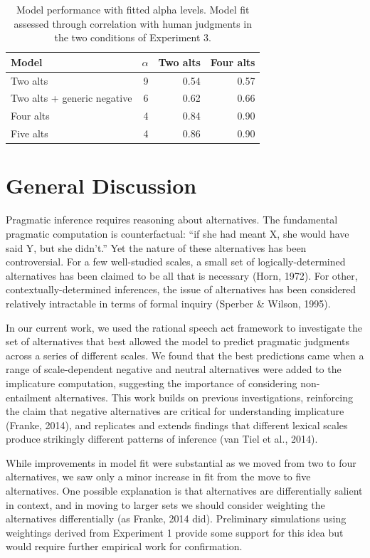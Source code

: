 \documentclass[10pt, letterpaper]{article}
\begin{document}
\begin{table}[ht]
\centering
\begin{tabular}{lrrr}
  \hline
Model & $\alpha$ & Two alts & Four alts \\ 
  \hline
Two alts &   9 & 0.54 & 0.57 \\ 
  Two alts + generic negative  &   6 & 0.62 & 0.66 \\ 
  Four alts &   4 & 0.84 & 0.90 \\ 
  Five alts &   4 & 0.86 & 0.90 \\ 
   \hline
\end{tabular}
\caption{Model performance with fitted alpha levels. Model fit assessed through correlation with human judgments in the two conditions of Experiment 3.} 
\end{table}

\section{General Discussion}\label{general-discussion}

Pragmatic inference requires reasoning about alternatives. The
fundamental pragmatic computation is counterfactual: ``if she had meant
X, she would have said Y, but she didn't.'' Yet the nature of these
alternatives has been controversial. For a few well-studied scales, a
small set of logically-determined alternatives has been claimed to be
all that is necessary (Horn, 1972). For other, contextually-determined
inferences, the issue of alternatives has been considered relatively
intractable in terms of formal inquiry (Sperber \& Wilson, 1995).

In our current work, we used the rational speech act framework to
investigate the set of alternatives that best allowed the model to
predict pragmatic judgments across a series of different scales. We
found that the best predictions came when a range of scale-dependent
negative and neutral alternatives were added to the implicature
computation, suggesting the importance of considering non-entailment
alternatives. This work builds on previous investigations, reinforcing
the claim that negative alternatives are critical for understanding
implicature (Franke, 2014), and replicates and extends findings that
different lexical scales produce strikingly different patterns of
inference ({van Tiel} et al., 2014).

While improvements in model fit were substantial as we moved from two to
four alternatives, we saw only a minor increase in fit from the move to
five alternatives. One possible explanation is that alternatives are
differentially salient in context, and in moving to larger sets we
should consider weighting the alternatives differentially (as Franke,
2014 did). Preliminary simulations using weightings derived from
Experiment 1 provide some support for this idea but would require
further empirical work for confirmation.
\end{document}
